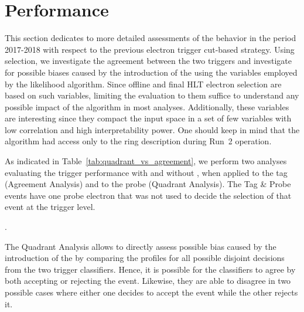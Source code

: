 
\chapter{\rnn{} Performance}%
\label{sec:off_ana}

This section dedicates to more detailed assessments of the \rnn{} behavior 
in the period 2017-2018 with respect to the previous electron trigger cut-based strategy.
Using \Zee{} \tnp{}
selection, we investigate the agreement between the two triggers and investigate
for possible biases caused by the introduction of the \rnn{} using the variables
employed by the likelihood algorithm. Since offline and final HLT electron
selection are based on such variables, limiting the evaluation to them suffice
to understand any possible impact of the \rnn{} algorithm in most analyses.
Additionally, these variables are interesting since they compact the input space
in a set of few variables with low correlation and high interpretability power. One should keep in mind that the \rnn{} algorithm had access only to the ring description during Run~2 operation.

As indicated in Table~\ref{tab:quadrant_vs_agreement}, we perform two analyses evaluating the
trigger performance with and without \rnn{}, when applied to the tag (Agreement Analysis) and
to the probe (Quadrant Analysis). The Tag \& Probe events have one probe electron that was not used to decide the selection of that event at the trigger level.


\begin{table}[ht!]\footnotesize
\centering
\caption{Customized \Zee{} \tap{} selection criteria employed in the
agreement and quadrant analyses in the Run 2 (2017-2018 period)}.%
\label{tab:quadrant_vs_agreement}
\end{table}

The Quadrant Analysis allows to directly assess possible bias caused by the
introduction of the \rnn{} by comparing the profiles for all possible disjoint
decisions from the two trigger classifiers. Hence, it is possible for the classifiers
to agree by both accepting or rejecting the event. Likewise, they are able to
disagree in two possible cases where either one decides to accept the event
while the other rejects it.

